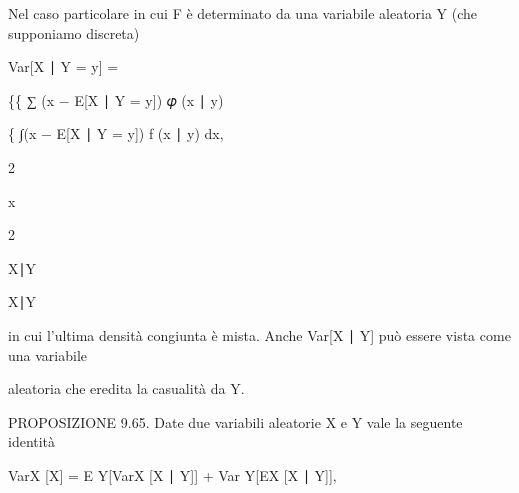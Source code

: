 \documentclass[a4paper,portrait,12pt]{article}
\begin{document}
\begin{flushleft}
Nel caso particolare in cui F \`{e} determinato da una variabile aleatoria Y (che supponiamo discreta)
\end{flushleft}


\begin{flushleft}
Var[X ∣ Y = y] =
\end{flushleft}





\begin{flushleft}
\{\{ ∑ (x $-$ E[X ∣ Y = y]) 𝜑 (x ∣ y)
\end{flushleft}


\begin{flushleft}
\{ ∫(x $-$ E[X ∣ Y = y]) f (x ∣ y) dx,
\end{flushleft}


2





\begin{flushleft}
x
\end{flushleft}





2





\begin{flushleft}
X∣Y
\end{flushleft}





\begin{flushleft}
X∣Y
\end{flushleft}





\begin{flushleft}
in cui l'ultima densit\`{a} congiunta \`{e} mista. Anche Var[X ∣ Y] pu\`{o} essere vista come una variabile
\end{flushleft}


\begin{flushleft}
aleatoria che eredita la casualit\`{a} da Y.
\end{flushleft}


\begin{flushleft}
PROPOSIZIONE 9.65. Date due variabili aleatorie X e Y vale la seguente identit\`{a}
\end{flushleft}


\begin{flushleft}
VarX [X] = E Y[VarX [X ∣ Y]] + Var Y[EX [X ∣ Y]],
\end{flushleft}
\end{document}
